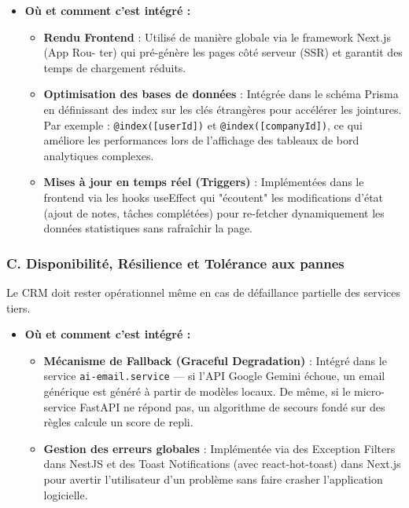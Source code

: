 \begin{itemize}
    \item \textbf{Où et comment c’est intégré :}
    \begin{itemize}
        \item \textbf{Rendu Frontend} : Utilisé de manière globale via le framework Next.js (App Rou-
        ter) qui pré-génère les pages côté serveur (SSR) et garantit des temps de chargement réduits.
        \item \textbf{Optimisation des bases de données} : Intégrée dans le schéma Prisma en définissant des index sur les clés étrangères pour accélérer les jointures. Par exemple : \texttt{@index([userId])} et \texttt{@index([companyId])}, ce qui améliore les performances lors de l’affichage des tableaux de bord analytiques complexes.
        \item \textbf{Mises à jour en temps réel (Triggers)} : Implémentées dans le frontend via les hooks useEffect qui "écoutent" les modifications d'état (ajout de notes, tâches complétées) pour re-fetcher dynamiquement les données statistiques sans rafraîchir la page.
    \end{itemize}
\end{itemize}

\subsubsection{C. Disponibilité, Résilience et Tolérance aux pannes}

Le CRM doit rester opérationnel même en cas de défaillance partielle des services tiers.

\begin{itemize}
    \item \textbf{Où et comment c’est intégré :}
    \begin{itemize}
        \item \textbf{Mécanisme de Fallback (Graceful Degradation)} : Intégré dans le service \texttt{ai-email.service} — si l’API Google Gemini échoue, un email générique est généré à partir de modèles locaux. De même, si le micro-service FastAPI ne répond pas, un algorithme de secours fondé sur des règles calcule un score de repli.
        \item \textbf{Gestion des erreurs globales} : Implémentée via des Exception Filters dans NestJS et des Toast Notifications (avec react-hot-toast) dans Next.js pour avertir l’utilisateur d’un problème sans faire crasher l’application logicielle.
    \end{itemize}
\end{itemize}

